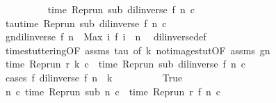 \begin{isabellebody}
\ \ \ \ \ \ \isamarkupfalse%
\ {\isacharquery}{\isasymtau}\ {\isacharequal}\ {\isacartoucheopen}time\ {\isacharparenleft}Rep{\isacharunderscore}run\ sub\ {\isacharparenleft}{\isacharparenleft}dil{\isacharunderscore}inverse\ f{\isacharparenright}\ n{\isacharparenright}\ c{\isacharparenright}{\isacartoucheclose}\isanewline
\ \ \ \ \ \ \isamarkupfalse%
\ tau{\isacharcolon}{\isacartoucheopen}time\ {\isacharparenleft}Rep{\isacharunderscore}run\ sub\ {\isacharparenleft}{\isacharparenleft}dil{\isacharunderscore}inverse\ f{\isacharparenright}\ n{\isacharparenright}\ c{\isacharparenright}\ {\isacharequal}\ {\isacharquery}{\isasymtau}{\isacartoucheclose}\ \isacommand{{\isachardot}{\isachardot}}\isamarkupfalse%
\isanewline
\ \ \ \ \ \ \isamarkupfalse%
\ gn{\isacharcolon}{\isacartoucheopen}{\isacharparenleft}dil{\isacharunderscore}inverse\ f{\isacharparenright}\ n\ {\isacharequal}\ Max\ {\isacharbraceleft}i{\isachardot}\ f\ i\ {\isasymle}\ n{\isacharbraceright}{\isacartoucheclose}\ \isamarkupfalse%
\ dil{\isacharunderscore}inverse{\isacharunderscore}def\ \isacommand{{\isachardot}{\isachardot}}\isamarkupfalse%
\isanewline
\ \ \ \ \ \ \isamarkupfalse%
\ time{\isacharunderscore}stuttering{\isacharbrackleft}OF\ assms\ tau{\isacharcomma}\ of\ k{\isacharbrackright}\ not{\isacharunderscore}image{\isacharunderscore}stut{\isacharbrackleft}OF\ assms\ gn{\isacharbrackright}\isanewline
\ \ \ \ \ \ \isamarkupfalse%
\ {\isacartoucheopen}time\ {\isacharparenleft}{\isacharparenleft}Rep{\isacharunderscore}run\ r{\isacharparenright}\ k\ c{\isacharparenright}\ {\isacharequal}\ time\ {\isacharparenleft}{\isacharparenleft}Rep{\isacharunderscore}run\ sub{\isacharparenright}\ {\isacharparenleft}{\isacharparenleft}dil{\isacharunderscore}inverse\ f{\isacharparenright}\ n{\isacharparenright}\ c{\isacharparenright}{\isacartoucheclose}\isanewline
\ \ \ \ \ \ \isamarkupfalse%
\ {\isacharparenleft}cases\ {\isacartoucheopen}f\ {\isacharparenleft}{\isacharparenleft}dil{\isacharunderscore}inverse\ f{\isacharparenright}\ n{\isacharparenright}\ {\isacharequal}\ k{\isacartoucheclose}{\isacharparenright}\isanewline
\ \ \ \ \ \ \ \ \isamarkupfalse%
\ True\isanewline
\ \ \ \ \ \ \ \ \ \ \isamarkupfalse%
\ \isamarkupfalse%
\ {\isacartoucheopen}{\isasymforall}n\ c{\isachardot}\ time\ {\isacharparenleft}Rep{\isacharunderscore}run\ sub\ n\ c{\isacharparenright}\ {\isacharequal}\ time\ {\isacharparenleft}Rep{\isacharunderscore}run\ r\ {\isacharparenleft}f\ n{\isacharparenright}\ c{\isacharparenright}{\isacartoucheclose}\isanewline

\end{isabellebody}
